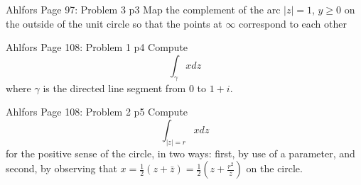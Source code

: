 \documentclass[a4paper, 11pt]{article}
\begin{document}
	\begin{problem}{%
			Ahlfors Page 97: Problem 3
		}{p3%
		}
		Map the complement of the arc $|z|=1$, $y\geq 0$ on the outside of the unit circle so that the points at  $\infty$ correspond to each other
	\end{problem}
	
	\solve{

	}
	
	
	
	\begin{problem}{%
			Ahlfors Page 108: Problem 1
		}{p4%
		}
Compute
$$
\int_\gamma x d z
$$
where $\gamma$ is the directed line segment from 0 to $1+i$.
	\end{problem}
	
	

	
	\begin{problem}{%
Ahlfors Page 108: Problem 2
		}{p5%
		}
	Compute
	$$
	\int_{|z|=r} x d z
	$$
	for the positive sense of the circle, in two ways: first, by use of a parameter, and second, by observing that $x=\frac{1}{2}(z+\bar{z})=\frac{1}{2}\left(z+\frac{r^2}{z}\right)$ on the circle.
	\end{problem}
	
\end{document}

